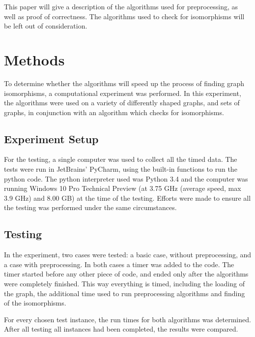 \documentclass[twoside]{article}
\theoremstyle{definition}
\theoremstyle{plain}
\begin{document}
\begin{multicols}{2}
This paper will give a description of the algorithms used for preprocessing, as well as proof of correctness. The algorithms used to check for isomorphisms will be left out of consideration.

\section{Methods}
To determine whether the algorithms will speed up the process of finding graph isomorphisms, a computational experiment was performed. In this experiment, the algorithms were used on a variety of differently shaped graphs, and sets of graphs, in conjunction with an algorithm which checks for isomorphisms.

\subsection{Experiment Setup}
For the testing, a single computer was used to collect all the timed data. The tests were run in JetBrains' PyCharm, using the built-in functions to run the python code. The python interpreter used was Python 3.4 and the computer was running Windows 10 Pro Technical Preview (at 3.75 GHz (average speed, max 3.9 GHz) and 8.00 GB) at the time of the testing. Efforts were made to ensure all the testing was performed under the same circumstances.

\subsection{Testing}
In the experiment, two cases were tested: a basic case, without preprocessing, and a case with preprocessing. In both cases a timer was added to the code. The timer started before any other piece of code, and ended only after the algorithms were completely finished. This way everything is timed, including the loading of the graph, the additional time used to run preprocessing algorithms and finding of the isomorphisms.

For every chosen test instance, the run times for both algorithms was determined. After all testing all instances had been completed, the results were compared.


\end{multicols}
\end{document}
